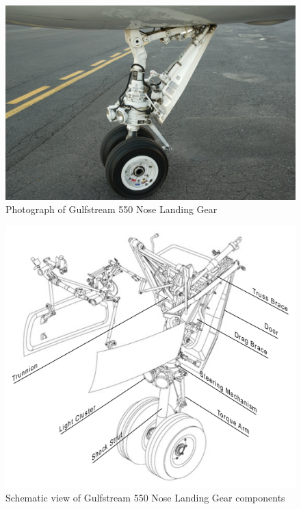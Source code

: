 \begin{figure}
	\begin{center}
		\centerline{\includegraphics[scale=0.4]{figures/g550_nlg.pdf}}
		\caption{Photograph of Gulfstream 550 Nose Landing Gear}
		\label{fig:lg1}
	\end{center}
\end{figure}

\begin{figure}
	\begin{center}
		\centerline{\includegraphics[scale=0.7]{figures/lg_schematic.pdf}}
		\caption{Schematic view of Gulfstream 550 Nose Landing Gear components}
		\label{fig:lg2}
	\end{center}
\end{figure}


